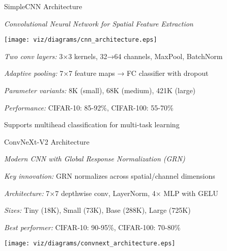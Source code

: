 \begin{slidewhite}[\slideopts,toc={CNN}]{SimpleCNN Architecture}
  
  \emph{Convolutional Neural Network for Spatial Feature Extraction}
  
  \vspace{1em}

  \centerline{\texttt{[image: viz/diagrams/cnn\_architecture.eps]}}

  \begin{itemize}
    \mpitem \emph{Two conv layers:} 3×3 kernels, 32→64 channels, MaxPool, BatchNorm
    
    \mpitem \emph{Adaptive pooling:} 7×7 feature maps → FC classifier with dropout
    
    \mpitem \emph{Parameter variants:} 8K (small), 68K (medium), 421K (large)
    
    \mpitem \emph{Performance:} CIFAR-10: 85-92\%, CIFAR-100: 55-70\%
    
    \mpitem Supports multihead classification for multi-task learning
  \end{itemize}
  
\end{slidewhite}

\begin{slide}[\slideopts,toc={ConvNeXt}]{ConvNeXt-V2 Architecture}
  
  \emph{Modern CNN with Global Response Normalization (GRN)}
  
  \begin{itemize}
    \mpitem \emph{Key innovation:} GRN normalizes across spatial/channel dimensions
    
    \mpitem \emph{Architecture:} 7×7 depthwise conv, LayerNorm, 4× MLP with GELU
    
    \mpitem \emph{Sizes:} Tiny (18K), Small (73K), Base (288K), Large (725K)
    
    \mpitem \emph{Best performer:} CIFAR-10: 90-95\%, CIFAR-100: 70-80\%
  \end{itemize}
  
  \vspace{0.5em}
  \centerline{\texttt{[image: viz/diagrams/convnext\_architecture.eps]}}
\end{slide}


